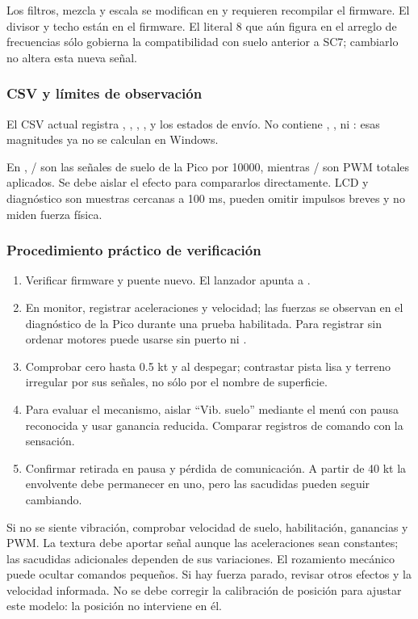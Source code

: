 Los filtros, mezcla y escala se modifican en  y requieren recompilar el firmware. El divisor  y techo  están en el firmware. El literal 8 que aún figura en el arreglo de frecuencias sólo gobierna la compatibilidad con suelo anterior a SC7; cambiarlo no altera esta nueva señal.

\subsubsection{CSV y límites de observación}
El CSV actual registra , , , ,  y los estados de envío. No contiene , ,  ni : esas magnitudes ya no se calculan en Windows.

En , / son las señales de suelo de la Pico por 10000, mientras / son PWM totales aplicados. Se debe aislar el efecto para compararlos directamente. LCD y diagnóstico son muestras cercanas a 100 ms, pueden omitir impulsos breves y no miden fuerza física.

\subsubsection{Procedimiento práctico de verificación}
\begin{enumerate}
\item Verificar firmware  y puente nuevo. El lanzador apunta a .
\item En monitor, registrar aceleraciones y velocidad; las fuerzas se observan en el diagnóstico de la Pico durante una prueba habilitada. Para registrar sin ordenar motores puede usarse  sin puerto ni .
\item Comprobar cero hasta 0.5 kt y al despegar; contrastar pista lisa y terreno irregular por sus señales, no sólo por el nombre de superficie.
\item Para evaluar el mecanismo, aislar ``Vib. suelo'' mediante el menú con pausa reconocida y usar ganancia reducida. Comparar registros de comando con la sensación.
\item Confirmar retirada en pausa y pérdida de comunicación. A partir de 40 kt la envolvente debe permanecer en uno, pero las sacudidas pueden seguir cambiando.
\end{enumerate}
Si no se siente vibración, comprobar velocidad de suelo, habilitación, ganancias y PWM. La textura debe aportar señal aunque las aceleraciones sean constantes; las sacudidas adicionales dependen de sus variaciones. El rozamiento mecánico puede ocultar comandos pequeños. Si hay fuerza parado, revisar otros efectos y la velocidad informada. No se debe corregir la calibración de posición para ajustar este modelo: la posición no interviene en él.

